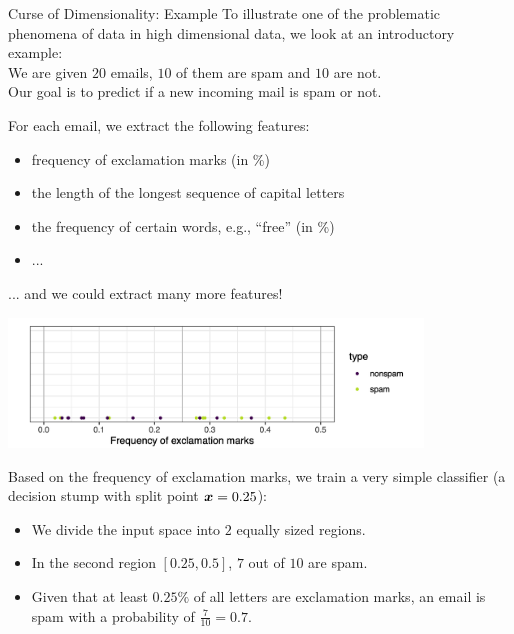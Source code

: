 \begin{vbframe}{Curse of Dimensionality: Example}
To illustrate one of the problematic phenomena of data in high dimensional data, we look at an introductory example: \\ \lz
We are given $20$ emails, $10$ of them are spam and $10$ are not. \\
Our goal is to predict if a new incoming mail is spam or not. 

\medskip

For each email, we extract the following features:

\begin{itemize}
\item frequency of exclamation marks (in \%)
\item the length of the longest sequence of capital letters
\item the frequency of certain words, e.g., \enquote{free} (in \%)
\item ... 
\end{itemize}

... and we could extract many more features!

\framebreak



\vspace*{0.1cm}
\begin{center}
\includegraphics[width = 11cm ]{figure_man/exclamation_marks.png}
\end{center}

Based on the frequency of exclamation marks, we train a very simple classifier (a decision stump with split point $\bm{x} = 0.25$):

\begin{itemize}
\item We divide the input space into $2$ equally sized regions.
\item In the second region $[0.25, 0.5]$, $7$ out of $10$ are spam.
\item Given that at least $0.25\%$ of all letters are exclamation marks, an email is spam with a probability of $\frac{7}{10} = 0.7$.
\end{itemize}
\framebreak



\end{vbframe}
